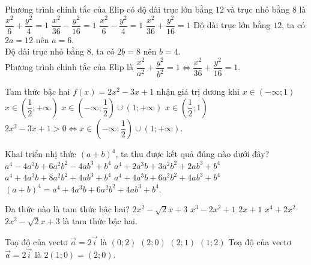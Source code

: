 \begin{ex}%

	Phương trình chính tắc của Elip có độ dài trục lớn bằng $12$ và trục nhỏ bằng $8$ là
	\choice
	{$\dfrac{x^2}{6}+\dfrac{y^2}{4}=1$}
	{$\dfrac{x^2}{36}-\dfrac{y^2}{16}=1$}
	{$\dfrac{x^2}{6}-\dfrac{y^2}{4}=1$}
	{\True $\dfrac{x^2}{36}+\dfrac{y^2}{16}=1$}
	\loigiai
	{
	Độ dài trục lớn bằng $12$, ta có $2a=12$ nên $a=6$.\\
	Độ dài trục nhỏ bằng $8$, ta có $2b=8$ nên $b=4$.\\
	Phương trình chính tắc của Elip là $\dfrac{x^2}{a^2}+\dfrac{y^2}{b^2}=1 \Leftrightarrow \dfrac{x^2}{36}+\dfrac{y^2}{16}=1$.
	}
\end{ex}
\begin{ex}%

	Tam thức bậc hai $f(x)=2 x^2-3 x+1$ nhận giá trị dương khi
	\choice
	{$x \in(-\infty ; 1)$}
	{$x \in\left(\dfrac{1}{2} ;+\infty\right)$}
	{\True $x \in\left(-\infty ; \dfrac{1}{2}\right) \cup(1 ;+\infty)$}
	{$x \in\left(\dfrac{1}{2} ; 1\right)$}
	\loigiai
	{
	$2 x^2-3 x+1>0 \Leftrightarrow x \in\left(-\infty ; \dfrac{1}{2}\right) \cup(1 ;+\infty)$.	
	}
\end{ex}
\begin{ex}%
Khai triển nhị thức $(a+b)^4$, ta thu được kết quả đúng nào dưới đây?	
	\choice
	{$a^4-4 a^3 b+6 a^2 b^2-4 a b^3+b^4$}
	{$a^4+2 a^3 b+3 a^2 b^2+2 a b^3+b^4$}
	{$a^4+4 a^3 b+8 a^2 b^2+4 a b^3+b^4$}
	{\True $a^4+4 a^3 b+6 a^2 b^2+4 a b^3+b^4$}
	\loigiai
	{
	$(a+b)^4=a^4+4 a^3 b+6 a^2 b^2+4 a b^3+b^4$.
	}
\end{ex}
\begin{ex}%
Đa thức nào là tam thức bậc hai? 
	\choice
	{\True $2 x^2-\sqrt{2} x+3$}
	{$x^3-2 x^2+1$}
	{$2x+1$}
	{$x^4+2 x^2$}
	\loigiai
	{
	$2 x^2-\sqrt{2} x+3$ là tam thức bậc hai.	
	}
\end{ex}
\begin{ex}%
Toạ độ của vectơ $\vec{a}=2 \vec{i}$ là
	\choice
	{$(0 ; 2)$}
	{\True $(2 ; 0)$}
	{$(2 ; 1)$}
	{$(1 ; 2)$}
	\loigiai
	{
		Toạ độ của vectơ $\vec{a}=2 \vec{i}$ là $2(1;0)=(2;0)$.
	}
\end{ex}
